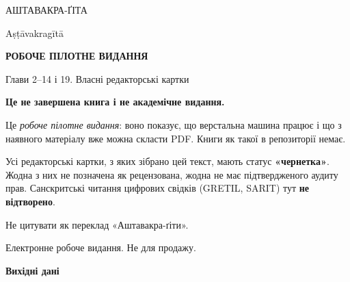 \documentclass[10pt,a5paper,openany]{book}
\begin{document}
\begin{titlepage}
\centering
\vspace*{2.0cm}

{\sffamily\Large АШТАВАКРА-ҐІТА\par}
\vspace{0.6em}
{\sffamily\small Aṣṭāvakragītā\par}

\vspace{2.2cm}
{\sffamily\bfseries\large РОБОЧЕ ПІЛОТНЕ ВИДАННЯ\par}
\vspace{0.5em}
{\sffamily Глави 2–14 і 19. Власні редакторські картки\par}

\vspace{2.4cm}
\begin{minipage}{0.86\textwidth}
\small\raggedright
\textbf{Це не завершена книга і не академічне видання.}

\vspace{0.5em}
Це \emph{робоче пілотне видання}: воно показує, що верстальна машина
працює і що з наявного матеріалу вже можна скласти PDF. Книги як такої
в репозиторії немає.

\vspace{0.5em}
Усі редакторські картки, з яких зібрано цей текст, мають статус
\textbf{«чернетка»}. Жодна з них не позначена як рецензована, жодна не
має підтвердженого аудиту прав. Санскритські читання цифрових свідків
(GRETIL, SARIT) тут \textbf{не відтворено}.

\vspace{0.5em}
Не цитувати як переклад «Аштавакра-ґіти».
\end{minipage}

\vfill
{\sffamily\footnotesize Електронне робоче видання. Не для продажу.\par}
\end{titlepage}

\thispagestyle{empty}
\vspace*{\fill}
\begingroup\small
\noindent\textbf{\sffamily Вихідні дані}
\end{document}

